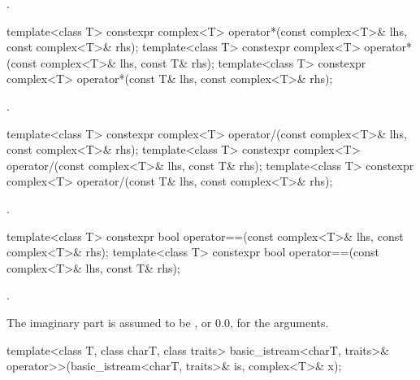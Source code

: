 \begin{itemdescr}
\pnum
\returns
{}.
\end{itemdescr}

%
\begin{itemdecl}
template<class T> constexpr complex<T> operator*(const complex<T>& lhs, const complex<T>& rhs);
template<class T> constexpr complex<T> operator*(const complex<T>& lhs, const T& rhs);
template<class T> constexpr complex<T> operator*(const T& lhs, const complex<T>& rhs);
\end{itemdecl}

\begin{itemdescr}
\pnum
\returns
{}.
\end{itemdescr}

%
\begin{itemdecl}
template<class T> constexpr complex<T> operator/(const complex<T>& lhs, const complex<T>& rhs);
template<class T> constexpr complex<T> operator/(const complex<T>& lhs, const T& rhs);
template<class T> constexpr complex<T> operator/(const T& lhs, const complex<T>& rhs);
\end{itemdecl}

\begin{itemdescr}
\pnum
\returns
{}.
\end{itemdescr}

%
\begin{itemdecl}
template<class T> constexpr bool operator==(const complex<T>& lhs, const complex<T>& rhs);
template<class T> constexpr bool operator==(const complex<T>& lhs, const T& rhs);
\end{itemdecl}

\begin{itemdescr}
\pnum
\returns
{}.

\pnum
\remarks
The imaginary part is assumed to be
,
or 0.0, for the
arguments.
\end{itemdescr}

%
\begin{itemdecl}
template<class T, class charT, class traits>
  basic_istream<charT, traits>& operator>>(basic_istream<charT, traits>& is, complex<T>& x);
\end{itemdecl}

